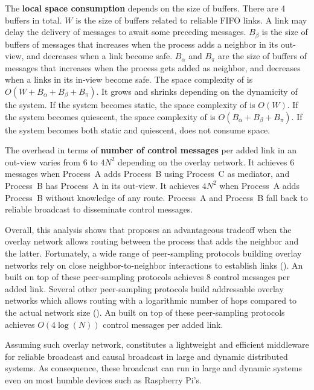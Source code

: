 \noindent The \textbf{local space consumption} depends on the size of
buffers. There are 4 buffers in total. $W$ is the size of buffers related to
reliable FIFO links. A link may delay the delivery of messages to await some
preceding messages. $B_\beta$ is the size of buffers of messages that increases when
the process adds a neighbor in its out-view, and decreases when a link become
safe. $B_\alpha$ and $B_\pi$ are the size of buffers of messages that increases
when the process gets added as neighbor, and decreases when a links in its
in-view become safe. The space complexity of \RPCBROADCAST is
$O(W  + B_\alpha + B_\beta + B_\pi)$. It grows and shrinks depending on the dynamicity
of the system. If the system becomes static, the space complexity of
\RPCBROADCAST is $O(W)$. If the system becomes quiescent, the space complexity
of \RPCBROADCAST is $O(B_\alpha+ B_\beta + B_\pi)$.  If the system becomes both
static and quiescent, \RPCBROADCAST does not consume
space. 

\noindent The overhead in terms of \textbf{number of control messages} per added
link in an out-view varies from $6$ to $4N^2$ depending on the overlay
network. It achieves $6$ messages when Process~A adds Process~B using Process~C
as mediator, and Process~B has Process~A in its out-view. It achieves $4N^2$
when Process~A adds Process~B without knowledge of any route. Process~A and
Process~B fall back to reliable broadcast to disseminate control
messages. 

Overall, this analysis shows that \RPCBROADCAST proposes an advantageous
tradeoff when the overlay network allows routing between the process that adds
the neighbor and the latter. Fortunately, a wide range of peer-sampling
protocols building overlay networks rely on close neighbor-to-neighbor
interactions to establish links (\REF). An \RPCBROADCAST built on top of these
peer-sampling protocols achieves $8$ control messages per added link. Several
other peer-sampling protocols build addressable overlay networks which allows
routing with a logarithmic number of hops compared to the actual network size
(\REF). An \RPCBROADCAST built on top of these peer-sampling protocols achieves
$O(4\log(N))$ control messages per added link.

Assuming such overlay network, \RPCBROADCAST constitutes a lightweight and
efficient middleware for reliable broadcast and causal broadcast in large and
dynamic distributed systems. As consequence, these broadcast can run in large
and dynamic systems even on most humble devices such as Raspberry Pi's.


